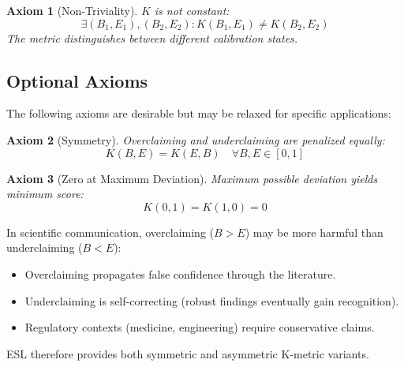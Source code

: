 \documentclass[11pt,a4paper]{article}
\newtheorem{axiom}{Axiom}[section]
\theoremstyle{remark}
\begin{document}
\begin{axiom}[Non-Triviality]
\label{ax:nontrivial}
$K$ is not constant:
\begin{equation}
\exists (B_1, E_1), (B_2, E_2): K(B_1, E_1) \neq K(B_2, E_2)
\end{equation}
The metric distinguishes between different calibration states.
\end{axiom}

\subsection{Optional Axioms}

The following axioms are desirable but may be relaxed for specific applications:

\begin{axiom}[Symmetry]
\label{ax:symmetry}
Overclaiming and underclaiming are penalized equally:
\begin{equation}
K(B, E) = K(E, B) \quad \forall B, E \in [0,1]
\end{equation}
\end{axiom}

\begin{axiom}[Zero at Maximum Deviation]
\label{ax:zero}
Maximum possible deviation yields minimum score:
\begin{equation}
K(0, 1) = K(1, 0) = 0
\end{equation}
\end{axiom}

\begin{keyinsight}[title={Why Symmetry May Be Undesirable}]
In scientific communication, overclaiming ($B > E$) may be more harmful than underclaiming ($B < E$):
\begin{itemize}
    \item Overclaiming propagates false confidence through the literature.
    \item Underclaiming is self-correcting (robust findings eventually gain recognition).
    \item Regulatory contexts (medicine, engineering) require conservative claims.
\end{itemize}
ESL therefore provides both symmetric and asymmetric K-metric variants.
\end{keyinsight}

\end{document}
